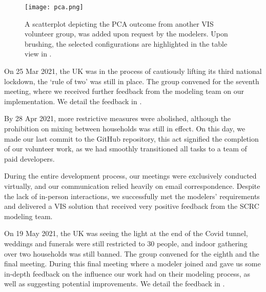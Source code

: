 \begin{figure}[tb!]
    \centering
    \texttt{[image: pca.png]}
    \caption{A scatterplot depicting the PCA outcome from another VIS volunteer group, was added upon request by the modelers. Upon brushing, the selected configurations are highlighted in the table view in .
    }
    \label{fig:pca}

\end{figure}

On 25 Mar 2021, the UK was in the process of cautiously lifting its third national lockdown, the `rule of two' was still in place.
The group convened for the seventh meeting, where we received further feedback from the modeling team on our implementation.
We detail the feedback in .


By 28 Apr 2021, more restrictive measures were abolished, although the prohibition on mixing between households was still in effect.
On this day, we made our last commit to the GitHub repository, this act signified the completion of our volunteer work, as we had smoothly transitioned all tasks to a team of paid developers.

During the entire development process, our meetings were exclusively conducted virtually, and our communication relied heavily on email correspondence.
Despite the lack of in-person interactions, we successfully met the modelers' requirements and delivered a \ac{VIS} solution that received very positive feedback from the SCRC modeling team.

On 19 May 2021, the UK was seeing the light at the end of the Covid tunnel, weddings and funerals were still restricted to 30 people, and indoor gathering over two households was still banned.
The group convened for the eighth and the final meeting.
During this final meeting where a modeler joined and gave us some in-depth feedback on the influence our work had on their modeling process, as well as suggesting potential improvements.
We detail the feedback in .
